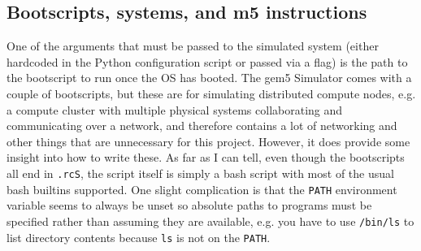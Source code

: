     \subsection{Bootscripts, systems, and m5 instructions}
    One of the arguments that must be passed to the simulated system (either 
    hardcoded in the Python configuration script or passed via a flag) is the 
    path to the bootscript to run once the OS has booted. The gem5 Simulator 
    comes with a couple of bootscripts, but these are for simulating distributed
    compute nodes, e.g. a compute cluster with multiple physical systems 
    collaborating and communicating over a network, and therefore contains a 
    lot of networking and other things that are unnecessary for this project. 
    However, it does provide some insight into how to write these. As far as I 
    can tell, even though the bootscripts all end in \texttt{.rcS}, the script 
    itself is simply a bash script with most of the usual bash builtins 
    supported. One slight complication is that the \texttt{PATH} environment 
    variable seems to always be unset so absolute paths to programs must be 
    specified rather than assuming they are available, e.g. you have to use 
    \texttt{/bin/ls} to list directory contents because \texttt{ls} is not on 
    the \texttt{PATH}.
    
